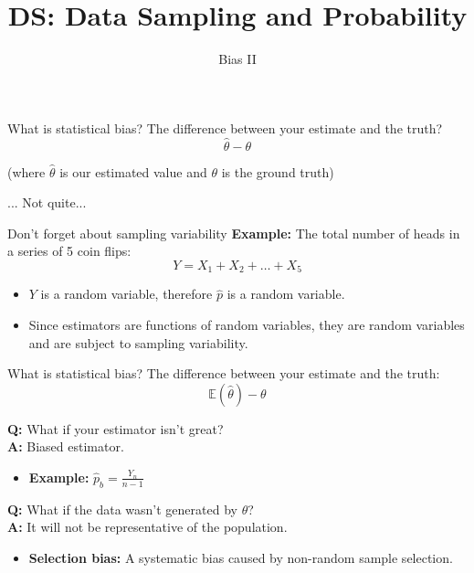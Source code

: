 \documentclass[aspectratio=169]{../latex_main/tntbeamer}  %
\title[Bias II]{DS: Data Sampling and Probability}
\subtitle{Bias II}
\begin{document}
	
	\maketitle
	
\begin{frame}{What is statistical bias?}
    The difference between your estimate and the truth?\\

$$\hat{\theta} - \theta$$

(where $\hat{\theta}$ is our estimated value and $\theta$ is the ground truth)

    \bigskip
    ... Not quite...
\end{frame}

\begin{frame}{Don’t forget about sampling variability}
    \textbf{Example:} The total number of heads in a series of 5 coin flips: 
    \begin{equation}
    Y = X_1 + X_2 + \dots + X_5
    \end{equation}
    \begin{itemize}
        \item $Y$ is a random variable, therefore $\hat{p}$ is a random variable.
        \item Since estimators are functions of random variables, they are random variables and are subject to sampling variability.
    \end{itemize}
\end{frame}

\begin{frame}{What is statistical bias?}
    The difference between your estimate and the truth:\\

    $$\mathbb{E}(\hat{\theta}) - \theta$$

    \textbf{Q:} What if your estimator isn’t great?\\
    \textbf{A:} Biased estimator.
    \begin{itemize}
        \item \textbf{Example:} $\hat{p}_b = \frac{Y_n}{n - 1}$
    \end{itemize}

    \bigskip

    \textbf{Q:} What if the data wasn’t generated by $\theta$?\\
    \textbf{A:} It will not be representative of the population.
    \begin{itemize}
        \item \textbf{Selection bias:} A systematic bias caused by non-random sample selection.
    \end{itemize}
\end{frame}
	
\end{document}
